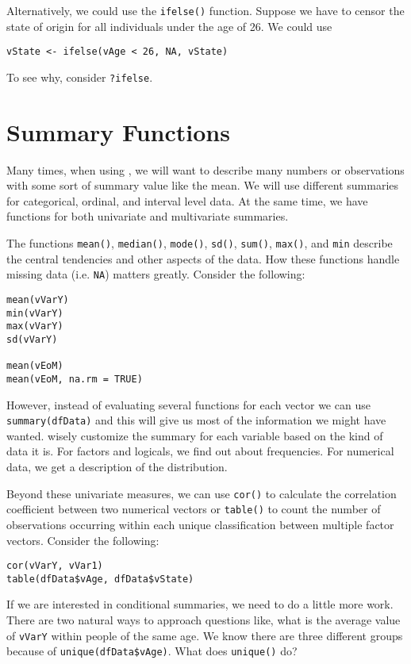 Alternatively, we could use the \texttt{ifelse()} function. Suppose we
have to censor the state of origin for all individuals under the age
of 26. We could use
\begin{verbatim}
vState <- ifelse(vAge < 26, NA, vState)
\end{verbatim}
To see why, consider \texttt{?ifelse}.

\section{Summary Functions}
Many times, when using \R{}, we will want to describe many numbers or
observations with some sort of summary value like the mean. We will
use different summaries for categorical, ordinal, and interval level
data. At the same time, we have functions for both univariate and
multivariate summaries.

The functions \texttt{mean()}, \texttt{median()}, \texttt{mode()},
\texttt{sd()}, \texttt{sum()}, \texttt{max()}, and \texttt{min}
describe the central tendencies and other aspects of the data. How
these functions handle missing data (i.e. \texttt{NA}) matters
greatly. Consider the following:
\begin{verbatim}
mean(vVarY)
min(vVarY)
max(vVarY)
sd(vVarY)

mean(vEoM)
mean(vEoM, na.rm = TRUE)
\end{verbatim}

However, instead of evaluating several functions for each vector we
can use \texttt{summary(dfData)} and this will give us most of the
information we might have wanted. \R{} wisely customize the summary
for each variable based on the kind of data it is. For factors and
logicals, we find out about frequencies. For numerical data, we get a
description of the distribution.

Beyond these univariate measures, we can use \texttt{cor()} to
calculate the correlation coefficient between two numerical vectors or
\texttt{table()} to count the number of observations occurring within
each unique classification between multiple factor vectors. Consider
the following:
\begin{verbatim}
cor(vVarY, vVar1)
table(dfData$vAge, dfData$vState)
\end{verbatim}

If we are interested in conditional summaries, we need to do a little
more work. There are two natural ways to approach questions like, what
is the average value of \texttt{vVarY} within people of the same
age. We know there are three different groups because of
\texttt{unique(dfData\$vAge)}. What does \texttt{unique()} do?

